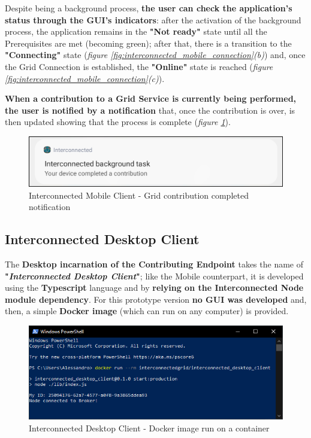 Despite being a background process, \textbf{the user can check the application's status through the GUI's indicators}: after the activation of the background process, the application remains in the \textbf{"Not ready"} state until all the Prerequisites are met (becoming green); after that, there is a transition to the \textbf{"Connecting"} state (\textit{figure \ref{fig:interconnected_mobile_connection}(b)}) and, once the Grid Connection is established, the \textbf{"Online"} state is reached (\textit{figure \ref{fig:interconnected_mobile_connection}(c)}).

\textbf{When a contribution to a Grid Service is currently being performed, the user is notified by a notification} that, once the contribution is over, is then updated showing that the process is complete (\textit{figure \ref{fig:notification_completed}}).

\begin{figure}[!ht]
    \centering
    \includegraphics[scale=0.35]{document/chapters/chapter_6/images/notification_completed.png}
    \caption{Interconnected Mobile Client - Grid contribution completed notification}
    \label{fig:notification_completed}
\end{figure}

\subsection{Interconnected Desktop Client}
The \textbf{Desktop incarnation of the Contributing Endpoint} takes the name of \textbf{"\textit{Interconnected Desktop Client}"}; like the Mobile counterpart, it is developed using the \textbf{Typescript} language and by \textbf{relying on the Interconnected Node module dependency}. For this prototype version \textbf{no GUI was developed} and, then, a simple \textbf{Docker image} (which can run on any computer) is provided.

\begin{figure}[!ht]
    \centering
    \includegraphics[scale=0.8]{document/chapters/chapter_6/images/interconnected_desktop.png}
    \caption{Interconnected Desktop Client - Docker image run on a container}
    \label{fig:interconnected_desktop}
\end{figure}

